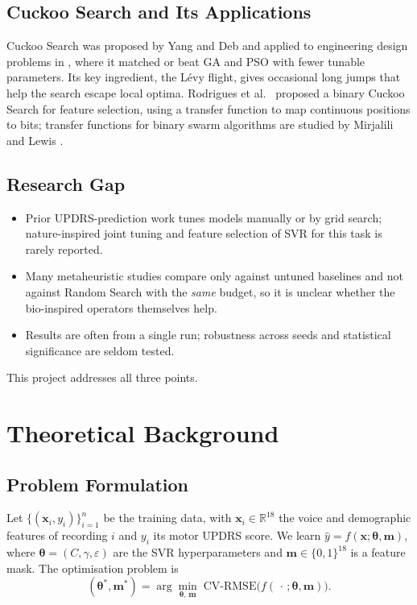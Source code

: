 \documentclass[12pt,a4paper]{article}
\numberwithin{equation}{section}
\numberwithin{table}{section}
\numberwithin{figure}{section}
\begin{document}
\subsection{Cuckoo Search and Its Applications}
Cuckoo Search was proposed by Yang and Deb \cite{yang2009} and applied to engineering design problems in \cite{yang2010eng}, where it matched or beat GA and PSO with fewer tunable parameters. Its key ingredient, the Lévy flight, gives occasional long jumps that help the search escape local optima. Rodrigues et al.\ \cite{rodrigues2013} proposed a binary Cuckoo Search for feature selection, using a transfer function to map continuous positions to bits; transfer functions for binary swarm algorithms are studied by Mirjalili and Lewis \cite{mirjalili2013}.

\subsection{Research Gap}
\begin{itemize}
  \item Prior UPDRS-prediction work tunes models manually or by grid search; nature-inspired joint tuning and feature selection of SVR for this task is rarely reported.
  \item Many metaheuristic studies compare only against untuned baselines and not against Random Search with the \emph{same} budget, so it is unclear whether the bio-inspired operators themselves help.
  \item Results are often from a single run; robustness across seeds and statistical significance are seldom tested.
\end{itemize}
This project addresses all three points.

\section{Theoretical Background}\label{sec:theory}

\subsection{Problem Formulation}
Let $\{(\mathbf{x}_i, y_i)\}_{i=1}^{n}$ be the training data, with $\mathbf{x}_i \in \mathbb{R}^{18}$ the voice and demographic features of recording $i$ and $y_i$ its motor UPDRS score. We learn $\hat{y} = f(\mathbf{x}; \boldsymbol{\theta}, \mathbf{m})$, where $\boldsymbol{\theta} = (C, \gamma, \varepsilon)$ are the SVR hyperparameters and $\mathbf{m} \in \{0,1\}^{18}$ is a feature mask. The optimisation problem is
\begin{equation}
  (\boldsymbol{\theta}^*, \mathbf{m}^*) = \arg\min_{\boldsymbol{\theta},\, \mathbf{m}} \; \mathrm{CV\text{-}RMSE}\big(f(\,\cdot\,; \boldsymbol{\theta}, \mathbf{m})\big).
\end{equation}
\end{document}
